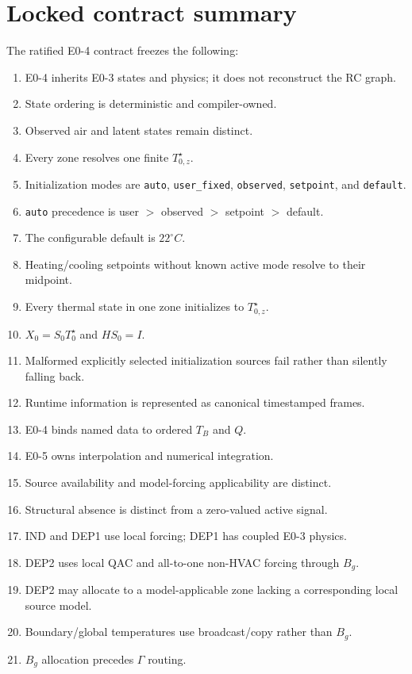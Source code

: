 \documentclass[11pt]{article}
\begin{document}
\section{Locked contract summary}
The ratified E0-4 contract freezes the following:
\begin{enumerate}[leftmargin=*]
\item E0-4 inherits E0-3 states and physics; it does not reconstruct the RC graph.
\item State ordering is deterministic and compiler-owned.
\item Observed air and latent states remain distinct.
\item Every zone resolves one finite \(T_{0,z}^{\star}\).
\item Initialization modes are \texttt{auto}, \texttt{user\_fixed}, \texttt{observed}, \texttt{setpoint}, and \texttt{default}.
\item \texttt{auto} precedence is user $>$ observed $>$ setpoint $>$ default.
\item The configurable default is \(22^\circ C\).
\item Heating/cooling setpoints without known active mode resolve to their midpoint.
\item Every thermal state in one zone initializes to \(T_{0,z}^{\star}\).
\item \(X_0=S_0T_0^\star\) and \(HS_0=I\).
\item Malformed explicitly selected initialization sources fail rather than silently falling back.
\item Runtime information is represented as canonical timestamped frames.
\item E0-4 binds named data to ordered \(T_B\) and \(Q\).
\item E0-5 owns interpolation and numerical integration.
\item Source availability and model-forcing applicability are distinct.
\item Structural absence is distinct from a zero-valued active signal.
\item IND and DEP1 use local forcing; DEP1 has coupled E0-3 physics.
\item DEP2 uses local QAC and all-to-one non-HVAC forcing through \(B_g\).
\item DEP2 may allocate to a model-applicable zone lacking a corresponding local source model.
\item Boundary/global temperatures use broadcast/copy rather than \(B_g\).
\item \(B_g\) allocation precedes \(\Gamma\) routing.

\end{enumerate}
\end{document}

